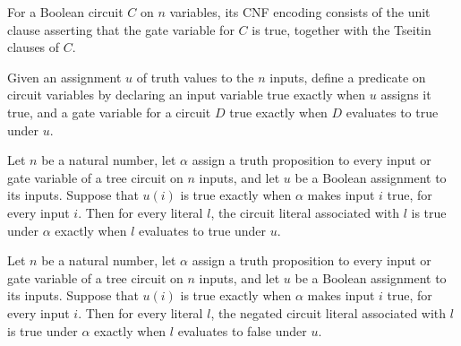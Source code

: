 \begin{definition}
\label{BoolCircuit.TreeCircuit.toCNF}
\leanok
{}
For a Boolean circuit $C$ on $n$ variables, its CNF encoding consists of the unit clause
asserting that the gate variable for $C$ is true, together with the Tseitin clauses of
$C$.
\end{definition}

\begin{definition}
\label{BoolCircuit.tseitinAssignment}
\leanok
{}
Given an assignment $u$ of truth values to the $n$ inputs, define a predicate on circuit
variables by declaring an input variable true exactly when $u$ assigns it true, and a
gate variable for a circuit $D$ true exactly when $D$ evaluates to true under $u$.
\end{definition}

\begin{theorem}
\label{BoolCircuit.evalLiteral_toCktLiteral_iff}
\leanok
{}
Let $n$ be a natural number, let $\alpha$ assign a truth proposition to every input or
gate variable of a tree circuit on $n$ inputs, and let $u$ be a Boolean assignment to
its inputs. Suppose that $u(i)$ is true exactly when $\alpha$ makes input $i$ true, for
every input $i$. Then for every literal $l$, the circuit literal associated with $l$ is
true under $\alpha$ exactly when $l$ evaluates to true under $u$.
\end{theorem}

\begin{theorem}
\label{BoolCircuit.evalLiteral_toCktLiteralNeg_iff}
\leanok
{}
Let $n$ be a natural number, let $\alpha$ assign a truth proposition to every input or
gate variable of a tree circuit on $n$ inputs, and let $u$ be a Boolean assignment to
its inputs. Suppose that $u(i)$ is true exactly when $\alpha$ makes input $i$ true, for
every input $i$. Then for every literal $l$, the negated circuit literal associated with
$l$ is true under $\alpha$ exactly when $l$ evaluates to false under $u$.
\end{theorem}

